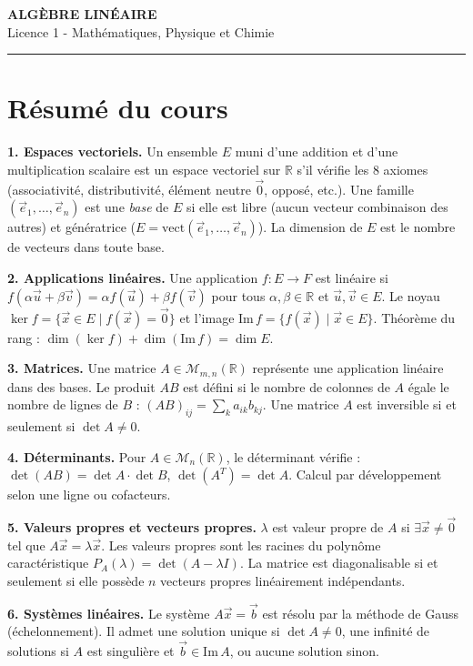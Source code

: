 \documentclass[12pt,a4paper]{article}
\begin{document}
\fi

\begin{center}
  {\LARGE\bfseries ALGÈBRE LINÉAIRE}\\[0.3cm]
  {\normalsize Licence 1 - Mathématiques, Physique et Chimie}\\[0.1cm]
  \rule{0.7\textwidth}{0.8pt}
\end{center}

\section*{Résumé du cours}

\begin{boiteresume}

\textbf{1. Espaces vectoriels.} Un ensemble $E$ muni d'une addition et d'une multiplication scalaire est un espace vectoriel sur $\mathbb{R}$ s'il vérifie les 8 axiomes (associativité, distributivité, élément neutre $\vec{0}$, opposé, etc.). Une famille $(\vec{e}_1,\ldots,\vec{e}_n)$ est une \textit{base} de $E$ si elle est libre (aucun vecteur combinaison des autres) et génératrice ($E = \text{vect}(\vec{e}_1,\ldots,\vec{e}_n)$). La dimension de $E$ est le nombre de vecteurs dans toute base.

\textbf{2. Applications linéaires.} Une application $f : E \to F$ est linéaire si $f(\alpha\vec{u}+\beta\vec{v}) = \alpha f(\vec{u})+\beta f(\vec{v})$ pour tous $\alpha,\beta\in\mathbb{R}$ et $\vec{u},\vec{v}\in E$. Le noyau $\ker f = \{\vec{x}\in E \mid f(\vec{x})=\vec{0}\}$ et l'image $\text{Im}\,f = \{f(\vec{x}) \mid \vec{x}\in E\}$. Théorème du rang : $\dim(\ker f) + \dim(\text{Im}\,f) = \dim E$.

\textbf{3. Matrices.} Une matrice $A\in\mathcal{M}_{m,n}(\mathbb{R})$ représente une application linéaire dans des bases. Le produit $AB$ est défini si le nombre de colonnes de $A$ égale le nombre de lignes de $B$ : $(AB)_{ij} = \sum_k a_{ik}b_{kj}$. Une matrice $A$ est inversible si et seulement si $\det A \neq 0$.

\textbf{4. Déterminants.} Pour $A\in\mathcal{M}_n(\mathbb{R})$, le déterminant vérifie : $\det(AB)=\det A\cdot\det B$, $\det(A^T)=\det A$. Calcul par développement selon une ligne ou cofacteurs.

\textbf{5. Valeurs propres et vecteurs propres.} $\lambda$ est valeur propre de $A$ si $\exists\vec{x}\neq\vec{0}$ tel que $A\vec{x}=\lambda\vec{x}$. Les valeurs propres sont les racines du polynôme caractéristique $P_A(\lambda) = \det(A-\lambda I)$. La matrice est diagonalisable si et seulement si elle possède $n$ vecteurs propres linéairement indépendants.

\textbf{6. Systèmes linéaires.} Le système $A\vec{x}=\vec{b}$ est résolu par la méthode de Gauss (échelonnement). Il admet une solution unique si $\det A\neq 0$, une infinité de solutions si $A$ est singulière et $\vec{b}\in\text{Im}\,A$, ou aucune solution sinon.

\end{boiteresume}
\end{document}
